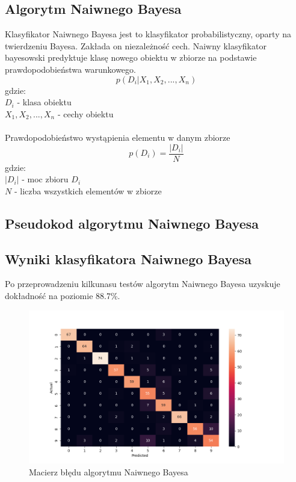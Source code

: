 \documentclass[12pt,a4paper]{article}
\begin{document}
\subsection{Algorytm Naiwnego Bayesa}
Klasyfikator Naiwnego Bayesa jest to klasyfikator probabilistyczny, oparty na twierdzeniu Bayesa.
Zakłada on niezależność cech. Naiwny klasyfikator bayesowski predyktuje klasę nowego obiektu w zbiorze na podstawie
prawdopodobieństwa warunkowego.
\[
	p(D_i | X_1, X_2, ..., X_n)
\]
gdzie:\\
\indent $D_i$ - klasa obiektu\\
\indent $X_1, X_2, ..., X_n$ - cechy obiektu\\~\\
Prawdopodobieństwo wystąpienia elementu w danym zbiorze
\[
	p(D_i) = \frac{|D_i|}{N}
\]
gdzie:\\
\indent $|D_i|$ - moc zbioru $D_i$\\
\indent $N$ - liczba wszystkich elementów w zbiorze
\subsection{Pseudokod algorytmu Naiwnego Bayesa}

\subsection{Wyniki klasyfikatora Naiwnego Bayesa}
Po przeprowadzeniu kilkunasu testów algorytm Naiwnego Bayesa uzyskuje dokładność
na poziomie 88.7\%.
\begin{figure}[!h]
	\includegraphics[scale=0.59]{"confusion_matrix_bayes.png"}
	\centering
	\caption{Macierz błędu algorytmu Naiwnego Bayesa}
\end{figure}
\end{document}
